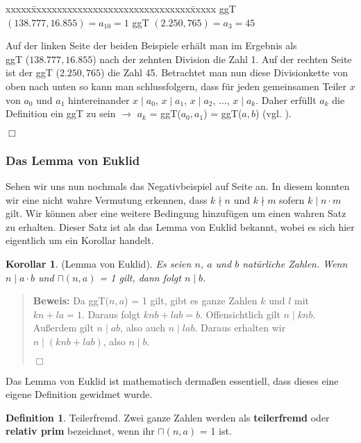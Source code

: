 \documentclass[12pt,a4paper]{article}
\theoremstyle{definition}
\newtheorem{defi}{Definition}[section]
\newtheorem{corollar}{Korollar}[subsection]
\begin{document}
\begin{tabbing}
xxxxx\=xxxxxxxxxxxxxxxxxxxxxxxxxxxxxxx\=xxxxx\kill
\> ggT $(138.777, 16.855) = a_{10} = 1$ \> ggT $(2.250, 765) = a_3 = 45$
\end{tabbing}

Auf der linken Seite der beiden Beispiele erhält man im Ergebnis als\\
ggT ($138.777, 16.855$) nach der zehnten Division die Zahl 1. Auf der rechten Seite ist der ggT ($2.250, 765$) die Zahl 45.
Betrachtet man nun diese Divisionkette von oben nach unten so kann man schlussfolgern, dass für jeden gemeinsamen Teiler $x$ von $a_0$ und $a_1$ hintereinander $x \mid a_0$, $x \mid a_1$, $x \mid a_2$, ..., $x \mid a_k$.\newline
Daher erfüllt $a_k$ die Definition ein ggT zu sein $\to$ $a_k$ = ggT($a_0,a_1$) = ggT($a, b$) (vgl. \cite[58--59]{Remmert1995}).
\begin{flushright}
$\Box$
\end{flushright}


\subsubsection{Das Lemma von Euklid}
Sehen wir uns nun nochmals das Negativbeispiel auf Seite \pageref{Negativbeispiel} an.
In diesem konnten wir eine nicht wahre Vermutung erkennen, dass $k \nmid n$ und $k \nmid m$ sofern $k \mid n \cdot m$ gilt.
Wir können aber eine weitere Bedingung hinzufügen um einen wahren Satz zu erhalten.
Dieser Satz ist als das Lemma von Euklid bekannt, wobei es sich hier eigentlich um ein Korollar handelt.

\begin{corollar}(Lemma von Euklid).\newline
\textit{Es seien $n$, $a$ und $b$ natürliche Zahlen.\newline
Wenn $n \mid a \cdot b$ und $\sqcap(n,a)$ = 1 gilt, dann folgt $n \mid b$.}
\end{corollar}

\begin{quote}
\small
\textbf{Beweis:} Da ggT($n, a$) = 1 gilt, gibt es ganze Zahlen $k$ und $l$ mit $kn + la = 1$.
Daraus folgt $knb + lab = b$.
Offensichtlich gilt $n \mid knb$.
Außerdem gilt $n \mid ab$, also auch $n \mid lab$.\newline
Daraus erhalten wir $n \mid (knb + lab)$, also $n \mid b$.\newline
\autocite[246--247]{Houston2012}
\begin{flushright}
$\Box$
\end{flushright}
\end{quote}
Das Lemma von Euklid ist mathematisch dermaßen essentiell, dass dieses eine eigene Definition gewidmet wurde.
\begin{defi}{Teilerfremd}.\newline
Zwei ganze Zahlen werden als \textbf{teilerfremd} oder \textbf{relativ prim} bezeichnet, wenn ihr $\sqcap(n, a)$ = 1 ist.
\end{defi}
\end{document}
